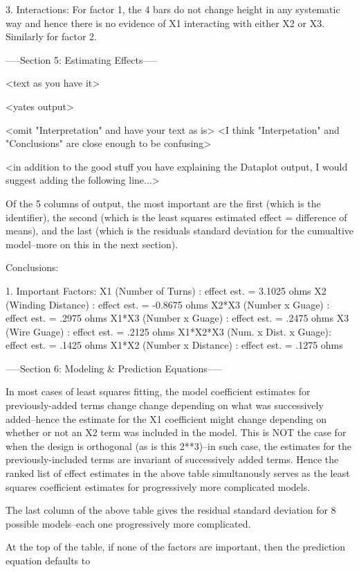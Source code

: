 3. Interactions:
   For factor 1, the 4 bars do not change
   height in any systematic way and hence there
   is no evidence of X1 interacting with either
   X2 or X3.  Similarly for factor 2.

-----Section 5: Estimating Effects-----

<text as you have it>

<yates output>

<omit "Interpretation" and have your text as is>
<I think "Interpetation" and "Conclusions" are close enough
to be confusing>

<in addition to the good stuff you  have explaining the Dataplot
output, I would suggest adding the following line...>

Of the 5 columns of output, the most important are the first
(which is the identifier), the second (which is the least squares
estimated effect = difference of means), and the last (which
is the residuals standard deviation for the cumualtive model--more on
this in the next section).

Conclusions:

1. Important Factors:
   X1 (Number of Turns)           : effect est. =  3.1025 ohms
   X2 (Winding Distance)          : effect est. = -0.8675 ohms
   X2*X3 (Number x Guage)         : effect est. =   .2975 ohms
   X1*X3 (Number x Guage)         : effect est. =   .2475 ohms
   X3 (Wire Guage)                : effect est. =   .2125 ohms
   X1*X2*X3 (Num. x Dist. x Guage): effect est. =   .1425 ohms
   X1*X2 (Number x Distance)      : effect est. =   .1275 ohms

-----Section 6: Modeling & Prediction Equations-----

In most cases of least squares fitting, the model
coefficient estimates for previously-added terms
change change depending on what was successively
added--hence the estimate for the X1 coefficient
might change depending on whether or not an X2
term was included in the model.  This is NOT the
case for when the design is orthogonal (as is this
2**3)--in such case, the estimates for the
previously-included terms are invariant of
successively added terms.  Hence the ranked list
of effect estimates in the above table
simultanously serves as the least squares
coefficient estimates for progressively more
complicated models.

The last column of the above table gives the
residual standard deviation for 8 possible
models--each one progressively more complicated.

At the top of the table, if none of the factors
are important, then the prediction equation
defaults to

